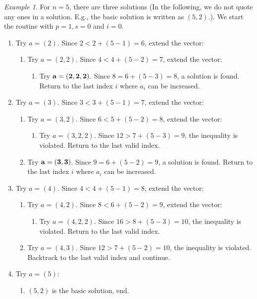 \documentclass[10pt]{article}
\theoremstyle{definition}
\theoremstyle{remark}
\newtheorem{example}{Example}
\numberwithin{equation}{section}
\begin{document}
\begin{example}\label{ex: 1}
For $n=5$, there are three solutions (In the following, we do not quote any ones in a solution. E.g., the basic solution is written as $(5,2)$.). We start
the routine with $p=1,s=0$ and $i=0$.
\begin{enumerate}
  \item Try $a=(2)$. Since $2 < 2 + (5 - 1) = 6$, extend the vector:
  \begin{enumerate}
    \item Try $a=(2,2)$. Since $4 < 4 + (5 - 2) = 7$, extend the vector:
    \begin{enumerate}
      \item Try ${\bf a=(2,2,2)}$. Since $8 = 6 + (5 - 3) = 8$, a solution is found. Return to the last index $i$ where $a_i$ can be increased.
    \end{enumerate}
  \end{enumerate}

  \item Try $a=(3)$. Since $3 < 3 + (5 - 1) = 7$, extend the vector:
  \begin{enumerate}
    \item Try $a=(3,2)$. Since $6 < 5 + (5 - 2) = 8$, extend the vector:
    \begin{enumerate}
      \item Try $a=(3,2,2)$. Since $12 > 7 + (5 - 3) = 9$, the inequality is violated. Return to the last valid index.
    \end{enumerate}
    \item Try ${\bf a=(3,3)}$. Since $9 = 6 + (5 - 2) = 9$, a solution is found. Return to the last index $i$ where $a_i$ can be increased.
  \end{enumerate}

  \item Try $a=(4)$. Since $4 < 4 + (5 - 1) = 8$, extend the vector:
  \begin{enumerate}
    \item Try $a=(4,2)$. Since $8 < 6 + (5 - 2) = 9$, extend the vector:
    \begin{enumerate}
      \item Try $a=(4,2,2)$. Since $16 > 8 + (5 - 3) = 10$, the inequality is violated. Return to the last valid index.
    \end{enumerate}
    \item Try $a=(4,3)$. Since $12 > 7 + (5 - 2) = 10$, the inequality is violated. Backtrack to the last valid index and continue.
  \end{enumerate}

  \item Try $a=(5)$:
  \begin{enumerate}
    \item $(5,2)$ is the basic solution, end.
  \end{enumerate}
\end{enumerate}
\end{example}
\end{document}
